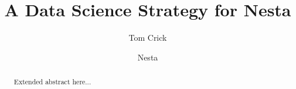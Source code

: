\documentclass[a4paper,twocolumn,11pt]{article}
\title{A Data Science Strategy for Nesta}
\author[1]{Tom Crick}
\author[2]{Nesta}
\affil[1]{Department of Computing \& Information Systems, Cardiff
  Metropolitan University}
\affil[2]{Nesta}
\affil[1]{\protect\url{tcrick@cardiffmet.ac.uk}}
\affil[2]{\protect\url{@nesta.org.uk}}
\date{ }
\begin{document}
\maketitle

\begin{abstract}
Extended abstract here...
\end{abstract}




\end{document}
